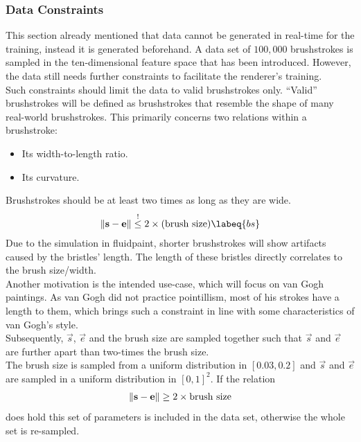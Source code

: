 \subsubsection{Data Constraints}
This section already mentioned that data cannot be generated in real-time for the training, instead it is generated beforehand.
A data set of $100,000$ brushstrokes is sampled in the ten-dimensional feature space that has been introduced.
However, the data still needs further constraints to facilitate the renderer's training.\\
Such constraints should limit the data to valid brushstrokes only.
``Valid'' brushstrokes will be defined as brushstrokes that resemble the shape of many real-world brushstrokes.
This primarily concerns two relations within a brushstroke:
\begin{itemize}
    \item Its width-to-length ratio.
    \item Its curvature.
\end{itemize}

Brushstrokes should be at least two times as long as they are wide.
\begin{align}
    \norm{\vec{s} - \vec{e}} \overset{!}{\leq}  2 \times (\text{brush size}) \labeq{bs}
\end{align}
Due to the simulation in fluidpaint, shorter brushstrokes will show artifacts caused by the bristles' length.
The length of these bristles directly correlates to the brush size/width.\\
Another motivation is the intended use-case, which will focus on van Gogh paintings.
As van Gogh did not practice pointillism, most of his strokes have a length to them, which brings such a constraint in line with some characteristics of van Gogh's style.\\
Subsequently, $\vec{s}$, $\vec{e}$ and the brush size are sampled together such that $\vec{s}$ and $\vec{e}$ are further apart than two-times the brush size.\\
The brush size is sampled from a uniform distribution in $[0.03, 0.2]$ and $\vec{s}$ and $\vec{e}$ are sampled in a uniform distribution in $[0, 1]^2$.
If the relation
\begin{align}
    \left\lVert\mathbf{s} - \mathbf{e}\right\rVert \geq 2 \times \text{brush size}
\end{align}
does hold this set of parameters is included in the data set, otherwise the whole set is re-sampled.

